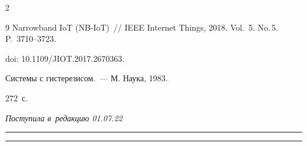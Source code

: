\begin{multicols}{2}
{{\begin{thebibliography}{9}
Narrowband IoT (NB-IoT)~// IEEE Internet Things, 2018. Vol.~5. No.\,5. P.~3710--3723. 


doi: 10.1109/JIOT.2017.2670363.




 Системы с гистерезисом.~--- М. Наука, 1983. 


272~с.





\end{thebibliography}





 }


 }





\end{multicols}





\vspace*{-6pt}





\hfill{\small\textit{Поступила в~редакцию 01.07.22}}





\vspace*{8pt}




















\hrule





\vspace*{2pt}





\hrule










